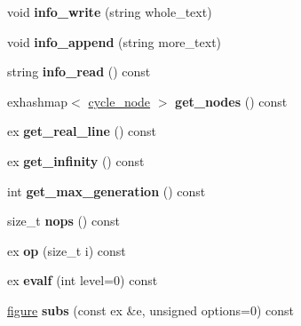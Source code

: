 \begin{DoxyCompactItemize}
void {\bfseries info\+\_\+write} (string whole\+\_\+text)
\item 
\mbox{\label{class_moeb_inv_1_1figure_a7c189df048d3428e392941c44cf836c0}} 
void {\bfseries info\+\_\+append} (string more\+\_\+text)
\item 
\mbox{\label{class_moeb_inv_1_1figure_ac6984f346a1a9244d137275cde32ccc2}} 
string {\bfseries info\+\_\+read} () const
\item 
\mbox{\label{class_moeb_inv_1_1figure_a6271596d854119c11008b9d083c2d169}} 
exhashmap$<$ \mbox{\hyperlink{class_moeb_inv_1_1cycle__node}{cycle\+\_\+node}} $>$ {\bfseries get\+\_\+nodes} () const
\item 
\mbox{\label{class_moeb_inv_1_1figure_a10f4beaf7cf4322b2b6c6a155e2e4ca2}} 
ex {\bfseries get\+\_\+real\+\_\+line} () const
\item 
\mbox{\label{class_moeb_inv_1_1figure_a70c256f1a0b7e27d6e6f6f369108ff01}} 
ex {\bfseries get\+\_\+infinity} () const
\item 
\mbox{\label{class_moeb_inv_1_1figure_a96c851ea4f8878c4416bdbeb7ace896b}} 
int {\bfseries get\+\_\+max\+\_\+generation} () const
\item 
\mbox{\label{class_moeb_inv_1_1figure_a7f0306adf95eeb332f67060e3bcad6df}} 
size\+\_\+t {\bfseries nops} () const
\item 
\mbox{\label{class_moeb_inv_1_1figure_afa4b697cf4a3807f2841f6499421833f}} 
ex {\bfseries op} (size\+\_\+t i) const
\item 
\mbox{\label{class_moeb_inv_1_1figure_a3f5bc6243d635a5f7c1b0e4a659f05e6}} 
ex {\bfseries evalf} (int level=0) const
\item 
\mbox{\label{class_moeb_inv_1_1figure_ab8fc6b722bb0f9f3472106b64d10c7bc}} 
\mbox{\hyperlink{class_moeb_inv_1_1figure}{figure}} {\bfseries subs} (const ex \&e, unsigned options=0) const
\item 

\end{DoxyCompactItemize}

